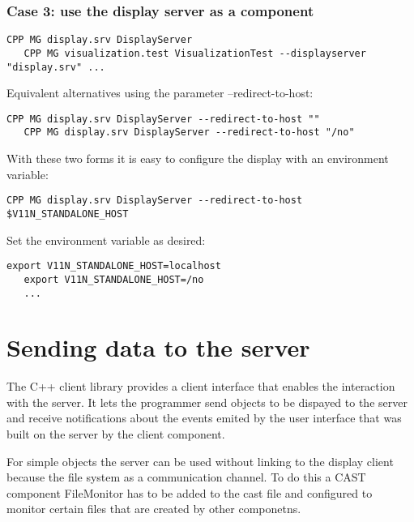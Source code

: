 \subsubsection*{Case 3: use the display server as a component}

\begin{Verbatim}[fontsize=\scriptsize,gobble=3]
   CPP MG display.srv DisplayServer
   CPP MG visualization.test VisualizationTest --displayserver "display.srv" ...
\end{Verbatim}

Equivalent alternatives using the parameter --redirect-to-host:

\begin{Verbatim}[fontsize=\scriptsize,gobble=3]
   CPP MG display.srv DisplayServer --redirect-to-host ""
   CPP MG display.srv DisplayServer --redirect-to-host "/no"
\end{Verbatim}

With these two forms it is easy to configure the display with an environment
variable:

\begin{Verbatim}[fontsize=\scriptsize,gobble=3]
   CPP MG display.srv DisplayServer --redirect-to-host $V11N_STANDALONE_HOST
\end{Verbatim}

Set the environment variable  as desired:

\begin{Verbatim}[fontsize=\scriptsize,gobble=3]
   export V11N_STANDALONE_HOST=localhost
   export V11N_STANDALONE_HOST=/no
   ...
\end{Verbatim}

\section{Sending data to the server}

The C++ client library provides a client interface that enables the interaction
with the server. It lets the programmer send objects to be dispayed to the
server and receive notifications about the events emited by the user interface
that was built on the server by the client component.

For simple objects the server can be used without linking to the display client
because the file system as a communication channel. To do this a CAST
component FileMonitor has to be added to the cast file and configured to
monitor certain files that are created by other componetns.

